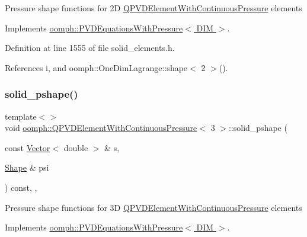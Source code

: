 Pressure shape functions for 2D \hyperlink{classoomph_1_1QPVDElementWithContinuousPressure}{Q\+P\+V\+D\+Element\+With\+Continuous\+Pressure} elements 

Implements \hyperlink{classoomph_1_1PVDEquationsWithPressure_ad580f7919412f6b574b76f514f56282c}{oomph\+::\+P\+V\+D\+Equations\+With\+Pressure$<$ D\+I\+M $>$}.



Definition at line 1555 of file solid\+\_\+elements.\+h.



References i, and oomph\+::\+One\+Dim\+Lagrange\+::shape$<$ 2 $>$().

\mbox{\label{classoomph_1_1QPVDElementWithContinuousPressure_a1a42e35d19a40cb3ce34ab2ef4bc821b}} 
\subsubsection{\texorpdfstring{solid\+\_\+pshape()}{solid\_pshape()}\hspace{0.1cm}{\footnotesize\ttfamily [3/3]}}
{\footnotesize\ttfamily template$<$$>$ \\
void \hyperlink{classoomph_1_1QPVDElementWithContinuousPressure}{oomph\+::\+Q\+P\+V\+D\+Element\+With\+Continuous\+Pressure}$<$ 3 $>$\+::solid\+\_\+pshape (\begin{DoxyParamCaption}\item[{const \hyperlink{classoomph_1_1Vector}{Vector}$<$ double $>$ \&}]{s,  }\item[{\hyperlink{classoomph_1_1Shape}{Shape} \&}]{psi }\end{DoxyParamCaption}) const\hspace{0.3cm}{\ttfamily [inline]}, {\ttfamily [protected]}, {\ttfamily [virtual]}}

Pressure shape functions for 3D \hyperlink{classoomph_1_1QPVDElementWithContinuousPressure}{Q\+P\+V\+D\+Element\+With\+Continuous\+Pressure} elements 

Implements \hyperlink{classoomph_1_1PVDEquationsWithPressure_ad580f7919412f6b574b76f514f56282c}{oomph\+::\+P\+V\+D\+Equations\+With\+Pressure$<$ D\+I\+M $>$}.



